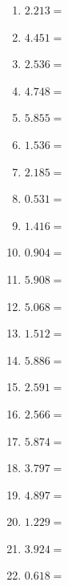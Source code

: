 \documentclass[12pt]{article}
\begin{document}
\begin{enumerate}
\item \large $ 2.213 = $ \vspace{1.5cm}
\item \large $ 4.451 = $ \vspace{1.5cm}
\item \large $ 2.536 = $ \vspace{1.5cm}
\item \large $ 4.748 = $ \vspace{1.5cm}
\newpage
\item \large $ 5.855 = $ \vspace{1.5cm}
\item \large $ 1.536 = $ \vspace{1.5cm}
\item \large $ 2.185 = $ \vspace{1.5cm}
\item \large $ 0.531 = $ \vspace{1.5cm}
\item \large $ 1.416 = $ \vspace{1.5cm}
\item \large $ 0.904 = $ \vspace{1.5cm}
\item \large $ 5.908 = $ \vspace{1.5cm}
\item \large $ 5.068 = $ \vspace{1.5cm}
\item \large $ 1.512 = $ \vspace{1.5cm}
\item \large $ 5.886 = $ \vspace{1.5cm}
\newpage
\item \large $ 2.591 = $ \vspace{1.5cm}
\item \large $ 2.566 = $ \vspace{1.5cm}
\item \large $ 5.874 = $ \vspace{1.5cm}
\item \large $ 3.797 = $ \vspace{1.5cm}
\item \large $ 4.897 = $ \vspace{1.5cm}
\item \large $ 1.229 = $ \vspace{1.5cm}
\item \large $ 3.924 = $ \vspace{1.5cm}
\item \large $ 0.618 = $ \vspace{1.5cm}

\end{enumerate}
\end{document}
